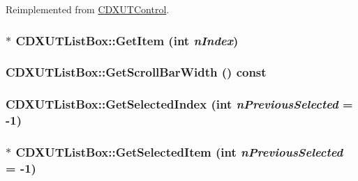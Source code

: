 Reimplemented from \hyperlink{class_c_d_x_u_t_control_a5b2c6c474236a79b257c86caded9c0b7}{CDXUTControl}.\hypertarget{class_c_d_x_u_t_list_box_ae438bf19f4954330d4557c41426df1b6}{
\subsubsection[{GetItem}]{ $\ast$ CDXUTListBox::GetItem ({\bf int} {\em nIndex})}}
\label{class_c_d_x_u_t_list_box_ae438bf19f4954330d4557c41426df1b6}
\hypertarget{class_c_d_x_u_t_list_box_a17fcbaece1316f5de54868bdb468fe6f}{
\subsubsection[{GetScrollBarWidth}]{ CDXUTListBox::GetScrollBarWidth () const}}
\label{class_c_d_x_u_t_list_box_a17fcbaece1316f5de54868bdb468fe6f}
\hypertarget{class_c_d_x_u_t_list_box_a719db30025631b50017d7f46e70b76b4}{
\subsubsection[{GetSelectedIndex}]{ CDXUTListBox::GetSelectedIndex ({\bf int} {\em nPreviousSelected} = {\ttfamily -\/1})}}
\label{class_c_d_x_u_t_list_box_a719db30025631b50017d7f46e70b76b4}
\hypertarget{class_c_d_x_u_t_list_box_a35b53b0bd5de2e1dfd0d09c53338f007}{
\subsubsection[{GetSelectedItem}]{$\ast$ CDXUTListBox::GetSelectedItem ({\bf int} {\em nPreviousSelected} = {\ttfamily -\/1})}}
\label{class_c_d_x_u_t_list_box_a35b53b0bd5de2e1dfd0d09c53338f007}
